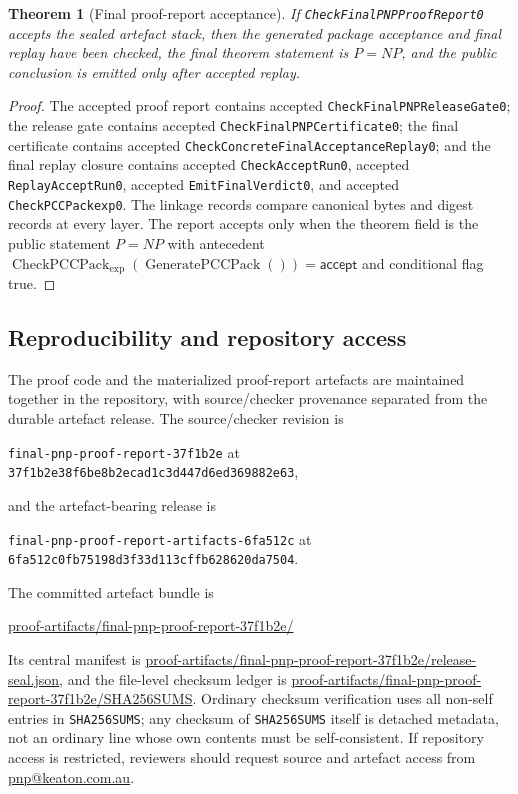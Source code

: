 \documentclass[10.5pt,a4paper]{article}
\newtheorem{theorem}{Theorem}[section]
\newcommand{\CheckPack}{\operatorname{CheckPCCPack}_{\exp}}
\newcommand{\GenPack}{\operatorname{GeneratePCCPack}}
\begin{document}
\begin{theorem}[Final proof-report acceptance]
If \texttt{CheckFinalPNPProofReport0} accepts the sealed artefact stack, then the generated package acceptance and final replay have been checked, the final theorem statement is \(P=NP\), and the public conclusion is emitted only after accepted replay.
\end{theorem}

\begin{proof}
The accepted proof report contains accepted \texttt{CheckFinalPNPReleaseGate0}; the release gate contains accepted \texttt{CheckFinalPNPCertificate0}; the final certificate contains accepted \texttt{CheckConcreteFinalAcceptanceReplay0}; and the final replay closure contains accepted \texttt{CheckAcceptRun0}, accepted \texttt{ReplayAcceptRun0}, accepted \texttt{EmitFinalVerdict0}, and accepted \texttt{CheckPCCPackexp0}.  The linkage records compare canonical bytes and digest records at every layer.  The report accepts only when the theorem field is the public statement \(P=NP\) with antecedent \(\CheckPack(\GenPack())=\mathsf{accept}\) and conditional flag true.
\end{proof}

\subsection{Reproducibility and repository access}
The proof code and the materialized proof-report artefacts are maintained together in the repository, with source/checker provenance separated from the durable artefact release.  The source/checker revision is
\begin{center}
\texttt{final-pnp-proof-report-37f1b2e} at \texttt{37f1b2e38f6be8b2ecad1c3d447d6ed369882e63},
\end{center}
and the artefact-bearing release is
\begin{center}
\texttt{final-pnp-proof-report-artifacts-6fa512c} at \texttt{6fa512c0fb75198d3f33d113cffb628620da7504}.
\end{center}
The committed artefact bundle is
\begin{center}
\url{proof-artifacts/final-pnp-proof-report-37f1b2e/}
\end{center}
Its central manifest is \url{proof-artifacts/final-pnp-proof-report-37f1b2e/release-seal.json}, and the file-level checksum ledger is \url{proof-artifacts/final-pnp-proof-report-37f1b2e/SHA256SUMS}.  Ordinary checksum verification uses all non-self entries in \texttt{SHA256SUMS}; any checksum of \texttt{SHA256SUMS} itself is detached metadata, not an ordinary line whose own contents must be self-consistent.  If repository access is restricted, reviewers should request source and artefact access from \href{mailto:pnp@keaton.com.au}{pnp@keaton.com.au}.
\end{document}
